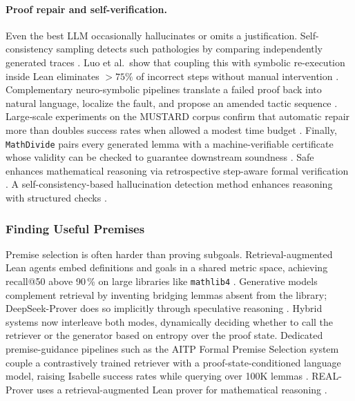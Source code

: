 \documentclass[acmsmall,anonymous]{acmart}
\begin{document}
\paragraph{Proof repair and self-verification.}
Even the best LLM occasionally hallucinates or omits a justification.  Self-consistency sampling detects such pathologies by comparing independently generated traces \cite{lewkowycz2022solving,lewkowycz2023donttrustverify}.  Luo et al.\ show that coupling this with symbolic re-execution inside Lean eliminates $>75\%$ of incorrect steps without manual intervention \cite{gupta2024saas}.  Complementary neuro-symbolic pipelines translate a failed proof back into natural language, localize the fault, and propose an amended tactic sequence \cite{jiang2023automated,jackson2024neurosymbolic}.  Large‐scale experiments on the MUSTARD corpus confirm that automatic repair more than doubles success rates when allowed a modest time budget \cite{huang2024mustard}.  Finally, \texttt{MathDivide} pairs every generated lemma with a machine-verifiable certificate whose validity can be checked to guarantee downstream soundness \cite{romera2024mathematical}. Safe enhances mathematical reasoning via retrospective step-aware formal verification \cite{liu-etal-2025-safe}. A self-consistency-based hallucination detection method enhances reasoning with structured checks \cite{liu2025}.

\subsubsection{Finding Useful Premises}\label{sec:premise}
Premise selection is often harder than proving subgoals.  Retrieval-augmented Lean agents embed definitions and goals in a shared metric space, achieving recall@50 above 90\,\% on large libraries like \texttt{mathlib4} \cite{yang-2023-leandojo}.  Generative models complement retrieval by inventing bridging lemmas absent from the library; DeepSeek-Prover does so implicitly through speculative reasoning \cite{xin2024deepseek}.  Hybrid systems now interleave both modes, dynamically deciding whether to call the retriever or the generator based on entropy over the proof state.  Dedicated premise-guidance pipelines such as the AITP Formal Premise Selection system couple a contrastively trained retriever with a proof-state-conditioned language model, raising Isabelle success rates while querying over 100K lemmas \cite{tworkowski-2022-formal-premise}. REAL-Prover uses a retrieval-augmented Lean prover for mathematical reasoning \cite{shen2025realprover}.
\end{document}
